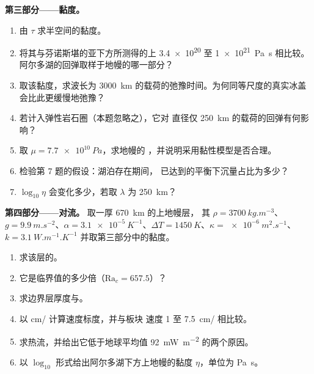 \begin{problem}
\medskip\noindent\textbf{第三部分——黏度。}
\begin{enumerate}[resume]
  \item 由 $\tau$ 求半空间的黏度。
  \item 将其与芬诺斯堪的亚下方所测得的上 \num{3.4e20}
        至 \qty{1e21}{Pa.s} 相比较。
        阿尔多湖的回弹取样于地幔的哪一部分？
  \item 取该黏度，求波长为
        \qty{3000}{km} 的载荷的弛豫时间。为何同等尺度的真实冰盖
        会比此更缓慢地弛豫？
  \item 若计入弹性岩石圈（本题忽略之），它对
        直径仅 \qty{250}{km} 的载荷的回弹有何影响？
  \item 取 $\mu = \qty{7.7e10}{Pa}$，求地幔的
        ，并说明采用黏性模型是否合理。
  \item 检验第 7 题的假设：湖泊存在期间，
        已达到的平衡下沉量占比为多少？
  \item $\log_{10}\eta$ 会变化多少，若取 $\lambda$ 为
        \qty{250}{km}？
\end{enumerate}

\medskip\noindent\textbf{第四部分——对流。} 取一厚 \qty{670}{km} 的上地幔层，
其 $\rho = \qty{3700}{kg.m^{-3}}$、$g =
\qty{9.9}{m.s^{-2}}$、$\alpha = \qty{3.1e-5}{K^{-1}}$、$\Delta T =
\qty{1450}{K}$、$\kappa = \qty{e-6}{m^2.s^{-1}}$、$k = \qty{3.1}{W.m^{-1}.K^{-1}}$
并取第三部分中的黏度。
\begin{enumerate}[resume]
  \item 求该层的。
  \item 它是临界值的多少倍（$\mathrm{Ra}_c = 657.5$）？
  \item 求边界层厚度与。
  \item 以 \unit{cm/} 计算速度标度，并与板块
        速度 1 至 \qty{7.5}{cm/} 相比较。
  \item 求热流，并给出它低于地球平均值
        \qty{92}{mW.m^{-2}} 的两个原因。
  \item 以 $\log_{10}$ 形式给出阿尔多湖下方上地幔的黏度
        $\eta$，单位为 \unit{Pa.s}。
\end{enumerate}
\end{problem}
